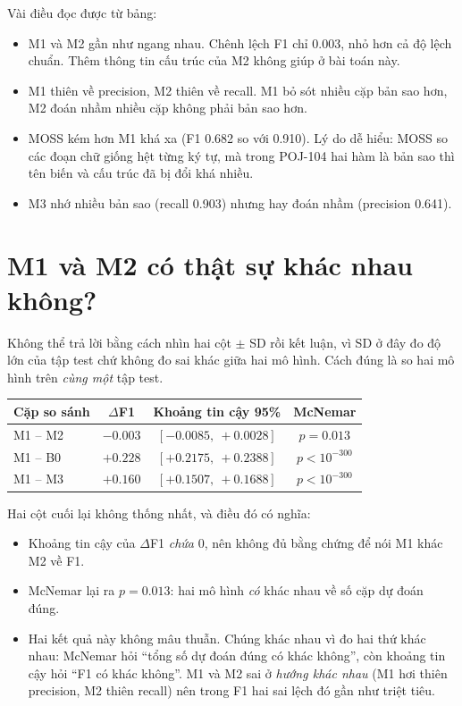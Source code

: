 \documentclass[11pt,a4paper]{article}
\newcommand{\hd}[1]{\textcolor{headblue}{\textbf{#1}}}
\begin{document}
Vài điều đọc được từ bảng:

\begin{itemize}[leftmargin=1.3em, itemsep=2pt]
    \item M1 và M2 gần như ngang nhau. Chênh lệch F1 chỉ 0.003, nhỏ hơn cả độ lệch
          chuẩn. Thêm thông tin cấu trúc của M2 không giúp ở bài toán này.
    \item M1 thiên về precision, M2 thiên về recall. M1 bỏ sót nhiều cặp bản sao hơn,
          M2 đoán nhầm nhiều cặp không phải bản sao hơn.
    \item MOSS kém hơn M1 khá xa (F1 0.682 so với 0.910). Lý do dễ hiểu: MOSS so
          các đoạn chữ giống hệt từng ký tự, mà trong POJ-104 hai hàm là bản sao
          thì tên biến và cấu trúc đã bị đổi khá nhiều.
    \item M3 nhớ nhiều bản sao (recall 0.903) nhưng hay đoán nhầm (precision 0.641).
\end{itemize}

\section{M1 và M2 có thật sự khác nhau không?}

Không thể trả lời bằng cách nhìn hai cột $\pm$ SD rồi kết luận, vì SD ở đây đo
độ lớn của tập test chứ không đo sai khác giữa hai mô hình. Cách đúng là so hai
mô hình trên \emph{cùng một} tập test.

\begin{center}
\begin{tabular}{lccc}
\toprule
\hd{Cặp so sánh} & \hd{$\Delta$F1} & \hd{Khoảng tin cậy 95\%} & \hd{McNemar} \\
\midrule
M1 -- M2  & $-0.003$ & $[-0.0085,\ +0.0028]$ & $p = 0.013$ \\
M1 -- B0  & $+0.228$ & $[+0.2175,\ +0.2388]$ & $p < 10^{-300}$ \\
M1 -- M3  & $+0.160$ & $[+0.1507,\ +0.1688]$ & $p < 10^{-300}$ \\
\bottomrule
\end{tabular}
\end{center}

Hai cột cuối lại không thống nhất, và điều đó có nghĩa:

\begin{itemize}[leftmargin=1.3em, itemsep=2pt]
    \item Khoảng tin cậy của $\Delta$F1 \emph{chứa} 0, nên không đủ bằng chứng để nói
          M1 khác M2 về F1.
    \item McNemar lại ra $p = 0.013$: hai mô hình \emph{có} khác nhau về số cặp dự
          đoán đúng.
    \item Hai kết quả này không mâu thuẫn. Chúng khác nhau vì đo hai thứ khác nhau:
          McNemar hỏi ``tổng số dự đoán đúng có khác không'', còn khoảng tin cậy hỏi
          ``F1 có khác không''. M1 và M2 sai ở \emph{hướng khác nhau} (M1 hơi thiên
          precision, M2 thiên recall) nên trong F1 hai sai lệch đó gần như triệt tiêu.
\end{itemize}
\end{document}
